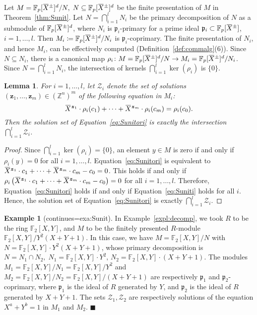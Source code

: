 \documentclass[a4paper,UKenglish,cleveref, autoref, thm-restate]{lipics-v2021}
\newcommand{\Z}{\mathbb{Z}}
\newcommand{\F}{\mathbb{F}}
\newcommand{\mZ}{\mathcal{Z}}
\newcommand{\bz}{\boldsymbol{z}}
\newcommand{\oX}{\mkern 1.5mu\overline{\mkern-1.5mu X \mkern-1.5mu}\mkern 1.5mu}
\newcommand{\frp}{\mathfrak{p}}
\newtheorem{lem}[thrm]{Lemma}
\theoremstyle{definition}
\theoremstyle{definition}
\newtheorem{exmpl}[thrm]{Example}
\theoremstyle{definition}
\begin{document}
Let $M = \F_p[\oX^{\pm}]^d/N, \; N \subseteq \F_p[\oX^{\pm}]^d$ be the finite presentation of $M$ in Theorem~\ref{thm:Sunit}.
Let $N = \bigcap_{i = 1}^l N_i$ be the primary decomposition of $N$ as a submodule of $\F_p[\oX^{\pm}]^d$, where $N_i$ is $\frp_i$-primary for a prime ideal $\frp_i \subset \F_p[\oX^{\pm}]$, $i = 1, \ldots, l$.
Then $M_i \coloneqq \F_p[\oX^{\pm}]^d/N_i$ is $\frp_i$-coprimary.
The finite presentation of $N_i$, and hence $M_i$, can be effectively computed (Definition~\ref{def:commalg}(6)).
Since $N \subseteq N_i$, there is a canonical map $\rho_i \colon M = \F_p[\oX^{\pm}]^d/N \rightarrow M_i = \F_p[\oX^{\pm}]^d/N_i$.
Since $N = \bigcap_{i = 1}^l N_i$, the intersection of kernels $\bigcap_{i=1}^l \ker(\rho_i)$ is $\{0\}$.



\begin{lem}\label{lem:inter}
    For $i = 1, \ldots, l$, let $\mZ_i$ denote the set of solutions $(\bz_1, \ldots, \bz_m) \in \left(\Z^n\right)^m$ of the following equation in $M_i$:
    \begin{equation}\label{eq:Suniti}
        \oX^{\bz_1} \cdot \rho_i(c_1) + \cdots + \oX^{\bz_m} \cdot \rho_i(c_m) = \rho_i(c_0).
    \end{equation}
    Then the solution set of Equation~\eqref{eq:Sunitori} is exactly the intersection $\bigcap_{i = 1}^l \mZ_i$.
\end{lem}
\begin{proof}
    Since $\bigcap_{i=1}^l \ker(\rho_i) = \{0\}$, an element $y \in M$ is zero if and only if $\rho_i(y) = 0$ for all $i = 1, \ldots, l$.
    Equation~\eqref{eq:Sunitori} is equivalent to 
    $
    \oX^{\bz_1} \cdot c_1 + \cdots + \oX^{\bz_m} \cdot c_m - c_0 = 0
    $.
    This holds if and only if 
    $
    \rho_i\left(\oX^{\bz_1} \cdot c_1 + \cdots + \oX^{\bz_m} \cdot c_m - c_0\right) = 0
    $
    for all $i = 1, \ldots, l$.
    Therefore, Equation~\eqref{eq:Sunitori} holds if and only if Equation~\eqref{eq:Suniti} holds for all $i$.
    Hence, the solution set of Equation~\eqref{eq:Sunitori} is exactly $\bigcap_{i = 1}^l \mZ_i$.
\end{proof}

\renewcommand\thmcontinues[1]{continued}
\begin{exmpl}[continues=exa:Sunit]
In Example~\ref{expl:decomp}, we took $R$ to be the ring $\F_2[X, Y]$, and $M$ to be the finitely presented $R$-module $\F_2[X, Y]/Y^2(X+Y+1)$. In this case, we have $M = \F_2[X, Y]/N$ with $N = \F_2[X, Y] \cdot Y^2(X+Y+1)$, whose primary decomposition is $N = N_1 \cap N_2, \; N_1 = \F_2[X, Y] \cdot Y^2, \, N_2 = \F_2[X, Y] \cdot (X+Y+1)$. The modules $M_1 = \F_2[X, Y]/N_1 = \F_2[X, Y]/Y^2$ and $M_2 = \F_2[X, Y]/N_2 = \F_2[X, Y]/(X+Y+1)$ are respectively $\frp_1$ and $\frp_2$-coprimary, where $\frp_1$ is the ideal of $R$ generated by $Y$, and $\frp_2$ is the ideal of $R$ generated by $X+Y+1$.
The sets $\mZ_1, \mZ_2$ are respectively solutions of the equation $X^a + Y^b = 1$ in $M_1$ and $M_2$.
    \hfill $\blacksquare$
\end{exmpl}
\end{document}
